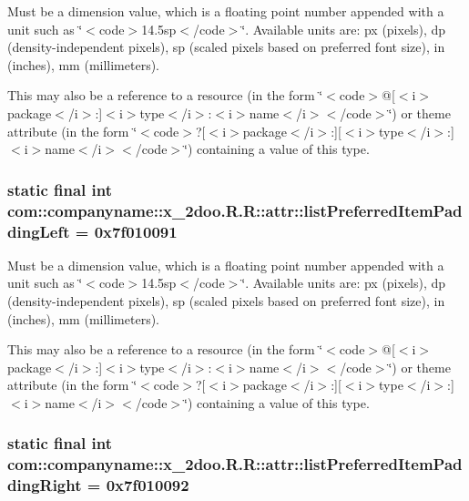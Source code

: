 Must be a dimension value, which is a floating point number appended with a unit such as \char`\"{}$<$code$>$14.5sp$<$/code$>$\char`\"{}. Available units are: px (pixels), dp (density-independent pixels), sp (scaled pixels based on preferred font size), in (inches), mm (millimeters). 

This may also be a reference to a resource (in the form \char`\"{}$<$code$>$@\mbox{[}$<$i$>$package$<$/i$>$:\mbox{]}$<$i$>$type$<$/i$>$:$<$i$>$name$<$/i$>$$<$/code$>$\char`\"{}) or theme attribute (in the form \char`\"{}$<$code$>$?\mbox{[}$<$i$>$package$<$/i$>$:\mbox{]}\mbox{[}$<$i$>$type$<$/i$>$:\mbox{]}$<$i$>$name$<$/i$>$$<$/code$>$\char`\"{}) containing a value of this type. \hypertarget{classcom_1_1companyname_1_1x__2doo_1_1_r_1_1attr_729389e01214590aced340e593326934}{
\subsubsection[{listPreferredItemPaddingLeft}]{\setlength{\rightskip}{0pt plus 5cm}static final int com::companyname::x\_\-2doo.R.R::attr::listPreferredItemPaddingLeft = 0x7f010091}}
\label{classcom_1_1companyname_1_1x__2doo_1_1_r_1_1attr_729389e01214590aced340e593326934}


Must be a dimension value, which is a floating point number appended with a unit such as \char`\"{}$<$code$>$14.5sp$<$/code$>$\char`\"{}. Available units are: px (pixels), dp (density-independent pixels), sp (scaled pixels based on preferred font size), in (inches), mm (millimeters). 

This may also be a reference to a resource (in the form \char`\"{}$<$code$>$@\mbox{[}$<$i$>$package$<$/i$>$:\mbox{]}$<$i$>$type$<$/i$>$:$<$i$>$name$<$/i$>$$<$/code$>$\char`\"{}) or theme attribute (in the form \char`\"{}$<$code$>$?\mbox{[}$<$i$>$package$<$/i$>$:\mbox{]}\mbox{[}$<$i$>$type$<$/i$>$:\mbox{]}$<$i$>$name$<$/i$>$$<$/code$>$\char`\"{}) containing a value of this type. \hypertarget{classcom_1_1companyname_1_1x__2doo_1_1_r_1_1attr_efcdf1ac2477c858ee7afc979714d867}{
\subsubsection[{listPreferredItemPaddingRight}]{\setlength{\rightskip}{0pt plus 5cm}static final int com::companyname::x\_\-2doo.R.R::attr::listPreferredItemPaddingRight = 0x7f010092}}
\label{classcom_1_1companyname_1_1x__2doo_1_1_r_1_1attr_efcdf1ac2477c858ee7afc979714d867}


